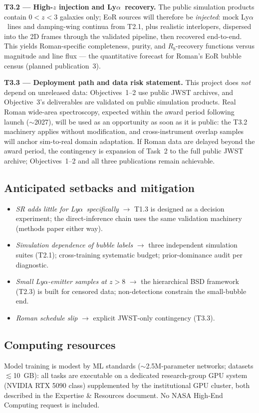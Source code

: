\documentclass[12pt,letterpaper]{article}
\newcommand{\lya}{Ly$\alpha$}
\begin{document}
\textbf{T3.2 --- High-$z$ injection and \lya\ recovery.} The public
simulation products contain $0<z<3$ galaxies only; EoR sources will
therefore be \emph{injected}: mock \lya\ lines and damping-wing continua
from T2.1, plus realistic interlopers, dispersed into the 2D frames
through the validated pipeline, then recovered end-to-end. This yields
Roman-specific completeness, purity, and $R_b$-recovery functions versus
magnitude and line flux --- the quantitative forecast for Roman's EoR
bubble census (planned publication~3).

\textbf{T3.3 --- Deployment path and data risk statement.} This project
does \emph{not} depend on unreleased data: Objectives~1--2 use public
JWST archives, and Objective~3's deliverables are validated on public
simulation products. Real Roman wide-area spectroscopy, expected within
the award period following launch ($\sim$2027), will be used as an
opportunity as soon as it is public: the T3.2 machinery applies without
modification, and cross-instrument overlap samples will anchor
sim-to-real domain adaptation. If Roman data are delayed beyond the award
period, the contingency is expansion of Task~2 to the full public JWST
archive; Objectives~1--2 and all three publications remain achievable.

\subsection{Anticipated setbacks and mitigation}
\begin{itemize}\setlength\itemsep{0pt}
\item \emph{SR adds little for \lya\ specifically} $\rightarrow$ T1.3 is
designed as a decision experiment; the direct-inference chain uses the
same validation machinery (methods paper either way).
\item \emph{Simulation dependence of bubble labels} $\rightarrow$
three independent simulation suites (T2.1); cross-training systematic
budget; prior-dominance audit per diagnostic.
\item \emph{Small \lya-emitter samples at $z>8$} $\rightarrow$ the
hierarchical BSD framework (T2.3) is built for censored data;
non-detections constrain the small-bubble end.
\item \emph{Roman schedule slip} $\rightarrow$ explicit JWST-only
contingency (T3.3).
\end{itemize}

\subsection{Computing resources}
Model training is modest by ML standards ($\sim$2.5M-parameter networks;
datasets $\lesssim$10~GB): all tasks are executable on a dedicated
research-group GPU system (NVIDIA RTX 5090 class) supplemented by the
institutional GPU cluster, both described in the Expertise \& Resources
document. No NASA High-End Computing request is included.
\end{document}
